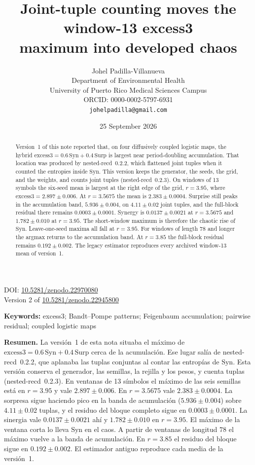 \documentclass[11pt,a4paper]{article}
\title{Joint-tuple counting moves the window-13 excess3\\
maximum into developed chaos}
\author{%
Johel Padilla-Villanueva\\
Department of Environmental Health\\
University of Puerto Rico Medical Sciences Campus\\
ORCID: 0000-0002-5797-6931\\
\texttt{johelpadilla@gmail.com}%
}
\date{25 September 2026}
\newcommand{\excess}{\mathrm{excess3}}
\begin{document}
\maketitle
\begin{center}
DOI: \href{https://doi.org/10.5281/zenodo.22970080}{10.5281/zenodo.22970080}\\
Version 2 of \href{https://doi.org/10.5281/zenodo.22945800}{10.5281/zenodo.22945800}
\end{center}

\begin{abstract}
Version~1 of this note reported that, on four diffusively coupled logistic
maps, the hybrid $\excess=0.6\,\mathrm{Syn}+0.4\,\mathrm{Surp}$ is largest
near period-doubling accumulation. That location was produced by
nested-recd~0.2.2, which flattened joint tuples when it counted the
entropies inside $\mathrm{Syn}$. This version keeps the generator, the
seeds, the grid, and the weights, and counts joint tuples
(nested-recd~0.2.3). On windows of 13 symbols the six-seed mean is largest
at the right edge of the grid, $r=3.95$, where
$\excess=2.897\pm 0.006$. At $r=3.5675$ the mean is
$2.383\pm 0.0004$. Surprise still peaks in the accumulation band,
$5.936\pm 0.004$, on $4.11\pm 0.02$ joint tuples, and the full-block
residual there remains $0.0003\pm 0.0001$. Synergy is
$0.0137\pm 0.0021$ at $r=3.5675$ and $1.782\pm 0.010$ at $r=3.95$.
The short-window maximum is therefore the chaotic rise of $\mathrm{Syn}$.
Leave-one-seed maxima all fall at $r=3.95$. For windows of length $78$ and
longer the argmax returns to the accumulation band. At $r=3.85$ the
full-block residual remains $0.192\pm 0.002$. The legacy estimator
reproduces every archived window-13 mean of version~1.
\end{abstract}

\noindent\textbf{Keywords:}
excess3; Bandt--Pompe patterns; Feigenbaum accumulation; pairwise residual;
coupled logistic maps

\vspace{0.6em}
\noindent\textbf{Resumen.}
La versión~1 de esta nota situaba el máximo de
$\excess=0.6\,\mathrm{Syn}+0.4\,\mathrm{Surp}$ cerca de la acumulación.
Ese lugar salía de nested-recd~0.2.2, que aplanaba las tuplas conjuntas al
contar las entropías de $\mathrm{Syn}$. Esta versión conserva el
generador, las semillas, la rejilla y los pesos, y cuenta tuplas
(nested-recd~0.2.3). En ventanas de 13 símbolos el máximo de las seis
semillas está en $r=3.95$ y vale $2.897\pm 0.006$. En $r=3.5675$ vale
$2.383\pm 0.0004$. La sorpresa sigue haciendo pico en la banda de
acumulación ($5.936\pm 0.004$) sobre $4.11\pm 0.02$ tuplas, y el residuo
del bloque completo sigue en $0.0003\pm 0.0001$. La sinergia vale
$0.0137\pm 0.0021$ ahí y $1.782\pm 0.010$ en $r=3.95$. El máximo de la
ventana corta lo lleva $\mathrm{Syn}$ en el caos. A partir de ventanas de
longitud $78$ el máximo vuelve a la banda de acumulación. En $r=3.85$ el
residuo del bloque sigue en $0.192\pm 0.002$. El estimador antiguo
reproduce cada media de la versión~1.
\end{document}
